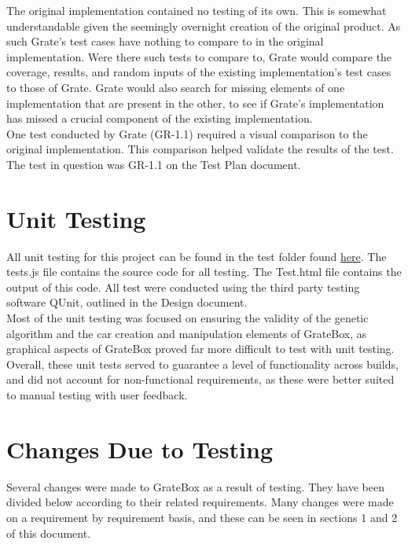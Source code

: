 \documentclass[12pt, titlepage]{article}
\begin{document}
The original implementation contained no testing of its own. This is somewhat 
understandable given the seemingly overnight creation of the original product. 
As such Grate's test cases have nothing to compare to in the original 
implementation. Were there such tests to compare to, Grate would compare the 
coverage, results, and random inputs of the existing implementation's test cases 
to those of Grate. Grate would also search for missing elements of one 
implementation that are present in the other, to see if Grate's implementation 
has missed a crucial component of the existing implementation.\\

One test conducted by Grate (GR-1.1) required a visual comparison to the 
original implementation. This 
comparison helped validate the results of the test. The test in question was 
GR-1.1 on the Test Plan document. 

\section{Unit Testing}

All unit testing for this project can be found in the test folder found 
\href{https://gitlab.cas.mcmaster.ca/linkk4/GrateBox/tree/master/src/test}{here}. 
The tests.js file contains the source code for all testing. The Test.html file 
contains the output of this code. All test were conducted using the third party 
testing software QUnit, outlined in the Design document.\\

Most of the unit testing was focused on ensuring the validity of the genetic 
algorithm and the car creation and manipulation elements of GrateBox, as 
graphical aspects of GrateBox proved far more difficult to test with unit 
testing.\\

Overall, these unit tests served to guarantee a level of functionality across 
builds, and did not account for non-functional requirements, as these were 
better suited to manual testing with user feedback.

\section{Changes Due to Testing}

Several changes were made to GrateBox as a result of testing. They have been 
divided below according to their related requirements. Many changes were made on 
a requirement by requirement basis, and these can be seen in sections 1 and 2 of 
this document.
\end{document}
